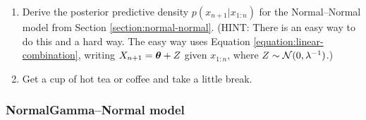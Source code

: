 \documentclass[12pt]{article}
\begin{document}
\begin{enumerate}
\item \label{exercise:predictive} Derive the posterior predictive density $p(x_{n +1}|x_{1:n})$ for the Normal--Normal model from Section \ref{section:normal-normal}. (HINT: There is an easy way to do this and a hard way. The easy way uses Equation \ref{equation:linear-combination}, writing $X_{n+1} = {\bm\theta} + Z$ given $x_{1:n}$, where $Z\sim\mathcal{N}(0,\lambda^{-1})$.)
\item Get a cup of hot tea or coffee and take a little break.
\end{enumerate}

\subsubsection*{NormalGamma--Normal model}
\end{document}
